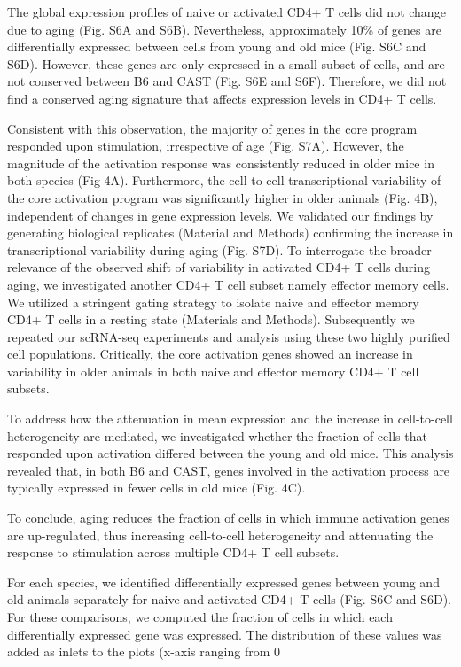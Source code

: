 The global expression profiles of naive or activated CD4+ T cells did not change due to aging (Fig. S6A and S6B). Nevertheless, approximately 10\% of genes are differentially expressed between cells from young and old mice (Fig. S6C and S6D). However, these genes are only expressed in a small subset of cells, and are not conserved between B6 and CAST (Fig. S6E and S6F). Therefore, we did not find a conserved aging signature that affects expression levels in CD4+ T cells.

Consistent with this observation, the majority of genes in the core program responded upon stimulation, irrespective of age (Fig. S7A). However, the magnitude of the activation response was consistently reduced in older mice in both species (Fig 4A). Furthermore, the cell-to-cell transcriptional variability of the core activation program was significantly higher in older animals (Fig. 4B), independent of changes in gene expression levels. We validated our findings by generating biological replicates (Material and Methods) confirming the increase in transcriptional variability during aging (Fig. S7D).
To interrogate the broader relevance of the observed shift of variability in activated CD4+ T cells during aging, we investigated another CD4+ T cell subset namely effector memory cells. We utilized a stringent gating strategy to isolate naive and effector memory CD4+ T cells in a resting state (Materials and Methods). Subsequently we repeated our scRNA-seq experiments and analysis using these two highly purified cell populations. Critically, the core activation genes showed an increase in variability in older animals in both naive and effector memory CD4+ T cell subsets.

To address how the attenuation in mean expression and the increase in cell-to-cell heterogeneity are mediated, we investigated whether the fraction of cells that responded upon activation differed between the young and old mice. This analysis revealed that, in both B6 and CAST, genes involved in the activation process are typically expressed in fewer cells in old mice (Fig. 4C).

To conclude, aging reduces the fraction of cells in which immune activation genes are up-regulated, thus increasing cell-to-cell heterogeneity and attenuating the response to stimulation across multiple CD4+ T cell subsets.

For each species, we identified differentially expressed genes between young and old animals separately for naive and activated CD4+ T cells (Fig. S6C and S6D). For these comparisons, we computed the fraction of cells in which each differentially expressed gene was expressed. The distribution of these values was added as inlets to the plots (x-axis ranging from 0%

